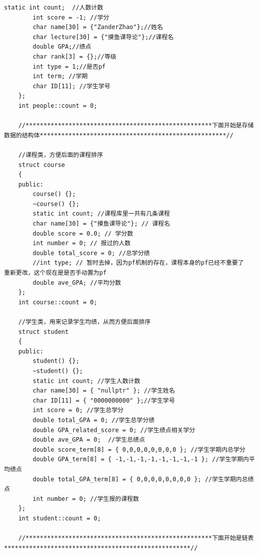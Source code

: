 \documentclass[fontset=windows]{article}
\begin{document}
\begin{lstlisting}[style = {cppstyle}]
		static int count;  //人数计数
		int score = -1; //学分
		char name[30] = {"ZanderZhao"};//姓名
		char lecture[30] = {"摸鱼课导论"};//课程名
		double GPA;//绩点
		char rank[3] = {};//等级
		int type = 1;//是否pf
		int term; //学期
		char ID[11]; //学生学号
	};
	int people::count = 0;
	
	//****************************************************下面开始是存储数据的结构体****************************************************//
	
	//课程类，方便后面的课程排序
	struct course
	{
	public:
		course() {};
		~course() {};
		static int count; //课程库里一共有几条课程
		char name[30] = {"摸鱼课导论"}; // 课程名
		double score = 0.0; // 学分数
		int number = 0; // 报过的人数
		double total_score = 0; //总学分绩
		//int type; // 暂时去掉，因为pf机制的存在，课程本身的pf已经不重要了    重新更改，这个现在是是否手动置为pf
		double ave_GPA; //平均分数
	};
	int course::count = 0;
	
	//学生类，用来记录学生均绩，从而方便后面排序
	struct student
	{
	public:
		student() {};
		~student() {};
		static int count; //学生人数计数
		char name[30] = { "nullptr" }; //学生姓名
		char ID[11] = { "0000000000" };//学生学号
		int score = 0; //学生总学分
		double total_GPA = 0; //学生总学分绩
		double GPA_related_score = 0; //学生绩点相关学分
		double ave_GPA = 0;  //学生总绩点
		double score_term[8] = { 0,0,0,0,0,0,0,0 }; //学生学期内总学分
		double GPA_term[8] = { -1,-1,-1,-1,-1,-1,-1,-1 }; //学生学期内平均绩点
		double total_GPA_term[8] = { 0,0,0,0,0,0,0,0 }; //学生学期内总绩点
		int number = 0; //学生报的课程数
	};
	int student::count = 0;
	
	//****************************************************下面开始是链表****************************************************//
	

\end{lstlisting}
\end{document}
